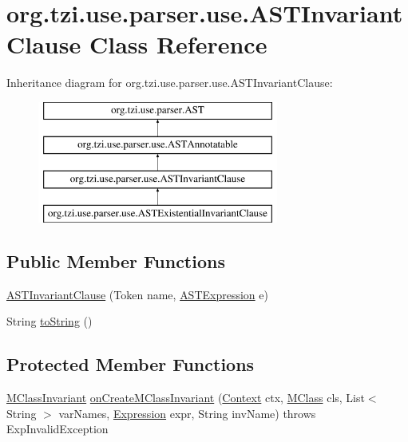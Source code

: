 \hypertarget{classorg_1_1tzi_1_1use_1_1parser_1_1use_1_1_a_s_t_invariant_clause}{\section{org.\-tzi.\-use.\-parser.\-use.\-A\-S\-T\-Invariant\-Clause Class Reference}
\label{classorg_1_1tzi_1_1use_1_1parser_1_1use_1_1_a_s_t_invariant_clause}
}
Inheritance diagram for org.\-tzi.\-use.\-parser.\-use.\-A\-S\-T\-Invariant\-Clause\-:\begin{figure}[H]
\begin{center}
\leavevmode
\includegraphics[height=4.000000cm]{classorg_1_1tzi_1_1use_1_1parser_1_1use_1_1_a_s_t_invariant_clause}
\end{center}
\end{figure}
\subsection*{Public Member Functions}
\begin{DoxyCompactItemize}
\item 
\hyperlink{classorg_1_1tzi_1_1use_1_1parser_1_1use_1_1_a_s_t_invariant_clause_ab61b617008b437014cd7d55998a573a2}{A\-S\-T\-Invariant\-Clause} (Token name, \hyperlink{classorg_1_1tzi_1_1use_1_1parser_1_1ocl_1_1_a_s_t_expression}{A\-S\-T\-Expression} e)
\item 
String \hyperlink{classorg_1_1tzi_1_1use_1_1parser_1_1use_1_1_a_s_t_invariant_clause_add1832854ab30cdb49d0b040f1410b48}{to\-String} ()
\end{DoxyCompactItemize}
\subsection*{Protected Member Functions}
\begin{DoxyCompactItemize}
\item 
\hyperlink{classorg_1_1tzi_1_1use_1_1uml_1_1mm_1_1_m_class_invariant}{M\-Class\-Invariant} \hyperlink{classorg_1_1tzi_1_1use_1_1parser_1_1use_1_1_a_s_t_invariant_clause_aac67dd8310eaceaf1d5b244d76996f5a}{on\-Create\-M\-Class\-Invariant} (\hyperlink{classorg_1_1tzi_1_1use_1_1parser_1_1_context}{Context} ctx, \hyperlink{interfaceorg_1_1tzi_1_1use_1_1uml_1_1mm_1_1_m_class}{M\-Class} cls, List$<$ String $>$ var\-Names, \hyperlink{classorg_1_1tzi_1_1use_1_1uml_1_1ocl_1_1expr_1_1_expression}{Expression} expr, String inv\-Name)  throws Exp\-Invalid\-Exception 
\end{DoxyCompactItemize}


